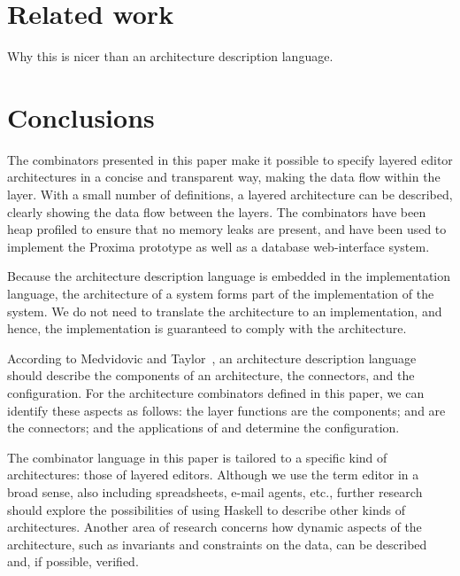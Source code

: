 \documentclass[preprint,natbib]{sigplanconf}
\begin{document}
%																
%																
%																
\section{Related work} \label{sect:relatedWork}

Why this is nicer than an architecture description language.




%																
%																
%																
\section{Conclusions} \label{sect:conclusions}

The combinators presented in this paper make it possible to specify layered editor architectures in a concise and transparent way, making the data flow within the layer. With a small number of definitions, a layered architecture can be described, clearly showing the data flow between the layers. The combinators have been heap profiled to ensure that no memory leaks are present, and have been used to implement the Proxima prototype as well as a database web-interface system.

Because the architecture description language is embedded in the implementation language, the architecture of a system forms part of the implementation of the system. We do not need to translate the architecture to an implementation, and hence, the implementation is guaranteed to comply with the architecture.

According to Medvidovic and Taylor~\cite{medvidovic00ADLs}, an architecture description language should describe the components of an architecture, the connectors, and the configuration. For the architecture combinators defined in this paper, we can identify these aspects as follows: the layer functions are the components;  and  are the connectors; and the applications of  and  determine the configuration.

The combinator language in this paper is tailored to a specific kind of architectures: those of layered editors. Although we use the term editor in a broad sense, also including spreadsheets, e-mail agents, etc., further research should explore the possibilities of using Haskell to describe other kinds of architectures. Another area of research concerns how dynamic aspects of the architecture, such as invariants and constraints on the data, can be described and, if possible, verified.









\end{document}
